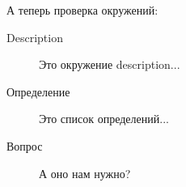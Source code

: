\documentclass[titlepage]{hedsemwork}
\begin{document}
А теперь проверка окружений:
\begin{description}
    \item[Description] Это окружение description...
    \item[Определение] Это список определений...
    \item[Вопрос] А оно нам нужно?
\end{description}
\listoffigures
\end{document}
